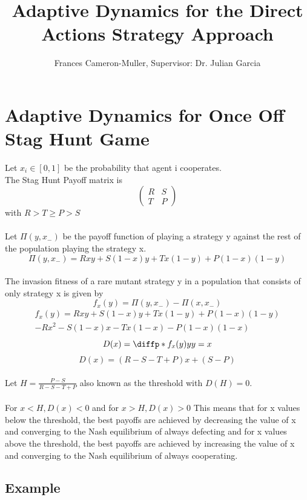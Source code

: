 \documentclass[]{llncs}
\begin{document}
\title{Adaptive Dynamics for the Direct Actions Strategy Approach}

\author{Frances Cameron-Muller, Supervisor: Dr. Julian Garcia}


\maketitle    

\section{Adaptive Dynamics for Once Off Stag Hunt Game}

Let $x_i \in [0,1]$ be the probability that agent i cooperates. \\
The Stag Hunt Payoff matrix is 
\[
  \begin{pmatrix} 
   R & S  \\
   T & P  
   \end{pmatrix} 
\]
with $ R > T \geq P > S $ \\
\\
Let $ \Pi ( y, x_{-} )$ be the payoff function of playing a strategy y against the rest of the population playing the strategy x. 
\[
\Pi ( y, x_{-} ) = R x y + S (1-x) y +  T x (1-y) + P (1-x) (1-y)
\]
\\
The invasion fitness of a rare mutant strategy y in a population that consists of only strategy x is given by 
\[
f_x(y) = \Pi ( y, x_{-} ) - \Pi ( x, x_{-} )
\]
\begin{multline}
f_x(y) = R x y + S (1-x) y +  T x (1-y) + P (1-x) (1-y) \\ - R x^2 - S (1-x) x - T x (1-x) - P (1-x) (1-x)
\end{multline}
\[
D(x) = \diffp*{f_x(y)}{y}{y=x}
\]
\[
D(x) = (R - S - T +P) x + (S-P)
\]
\\
Let $H = \frac{P-S}{R - S - T +P} $ also known as the threshold with $ D(H) = 0 $.\\
\\
For $x < H, D(x) < 0$ and for $x > H, D(x) > 0$
This means that for x values below the threshold, the best payoffs are achieved by decreasing the value of x and converging to the Nash equilibrium of always defecting and for x values above the threshold, the best payoffs are achieved by increasing the value of x and converging to the Nash equilibrium of always cooperating. 

\subsection{Example}
\end{document}
